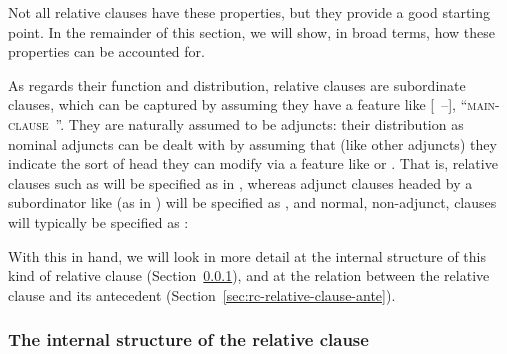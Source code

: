 \documentclass[output=paper
 	        ,biblatex
                ,babelshorthands
                ,newtxmath
                ,draftmode
                ,colorlinks, citecolor=brown
]{langscibook}
\begin{document}
Not all relative clauses have these properties, but they provide a good starting point.
In the remainder of this section, we will show, in broad terms, how these properties can
be accounted for.

As regards their function and distribution, relative clauses are subordinate clauses,
which can be captured by assuming they have a  feature like [~{--}],
``\textsc{main-clause}~''. They are naturally assumed to be adjuncts: their
distribution as nominal adjuncts can be dealt with by assuming that (like other adjuncts)
they indicate the sort of head they can modify via a feature like  or
. %
That is,
relative clauses such as  will be specified as in , whereas
adjunct clauses headed by a subordinator like  (as in ) will be specified as , and normal, non-adjunct, clauses will
typically be specified as :
\begin{exe}\ex\begin{xlist}
  \ex\label{x:rc-5}
  \ex\label{x:rc-6}
 \ex\label{x:rc-7}
\end{xlist}
\end{exe}

With this in hand, we will look in more detail at the internal structure of this kind of
relative clause (Section~\ref{sec:rc-intern-struct-relat}), and at the relation between
the relative clause and its antecedent (Section~\ref{sec:rc-relative-clause-ante}).

\subsubsection{The internal structure of the relative clause}
\label{sec:rc-intern-struct-relat}\label{rc:sec-internal-structure}
\end{document}
